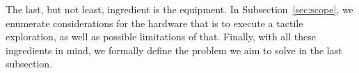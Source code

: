The last, but not least, ingredient is the equipment. In Subsection~\ref{sec:scope}, we enumerate considerations for the hardware that is to execute a tactile exploration, as well as possible limitations of that. Finally, with all these ingredients in mind, we formally define the problem we aim to solve in the last subsection.







